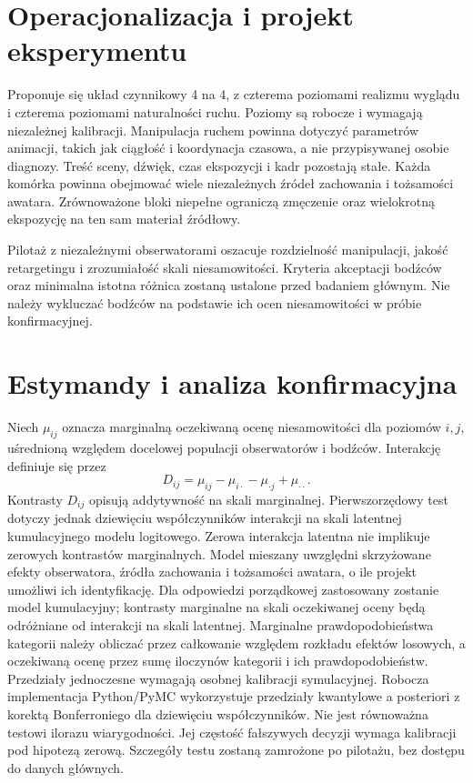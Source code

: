 \section{Operacjonalizacja i projekt eksperymentu}
Proponuje się układ czynnikowy 4 na 4, z czterema poziomami realizmu wyglądu i czterema poziomami naturalności ruchu. Poziomy są robocze i wymagają niezależnej kalibracji. Manipulacja ruchem powinna dotyczyć parametrów animacji, takich jak ciągłość i koordynacja czasowa, a nie przypisywanej osobie diagnozy. Treść sceny, dźwięk, czas ekspozycji i kadr pozostają stałe. Każda komórka powinna obejmować wiele niezależnych źródeł zachowania i tożsamości awatara. Zrównoważone bloki niepełne ograniczą zmęczenie oraz wielokrotną ekspozycję na ten sam materiał źródłowy.

Pilotaż z niezależnymi obserwatorami oszacuje rozdzielność manipulacji, jakość retargetingu i zrozumiałość skali niesamowitości. Kryteria akceptacji bodźców oraz minimalna istotna różnica zostaną ustalone przed badaniem głównym. Nie należy wykluczać bodźców na podstawie ich ocen niesamowitości w próbie konfirmacyjnej.

\section{Estymandy i analiza konfirmacyjna}
Niech $\mu_{ij}$ oznacza marginalną oczekiwaną ocenę niesamowitości dla poziomów $i,j$, uśrednioną względem docelowej populacji obserwatorów i bodźców. Interakcję definiuje się przez
\[
D_{ij}=\mu_{ij}-\mu_{i\cdot}-\mu_{\cdot j}+\mu_{\cdot\cdot}.
\]
Kontrasty $D_{ij}$ opisują addytywność na skali marginalnej. Pierwszorzędowy test dotyczy jednak dziewięciu współczynników interakcji na skali latentnej kumulacyjnego modelu logitowego. Zerowa interakcja latentna nie implikuje zerowych kontrastów marginalnych. Model mieszany uwzględni skrzyżowane efekty obserwatora, źródła zachowania i tożsamości awatara, o ile projekt umożliwi ich identyfikację. Dla odpowiedzi porządkowej zastosowany zostanie model kumulacyjny; kontrasty marginalne na skali oczekiwanej oceny będą odróżniane od interakcji na skali latentnej. Marginalne prawdopodobieństwa kategorii należy obliczać przez całkowanie względem rozkładu efektów losowych, a oczekiwaną ocenę przez sumę iloczynów kategorii i ich prawdopodobieństw. Przedziały jednoczesne wymagają osobnej kalibracji symulacyjnej. Robocza implementacja Python/PyMC wykorzystuje przedziały kwantylowe a posteriori z korektą Bonferroniego dla dziewięciu współczynników. Nie jest równoważna testowi ilorazu wiarygodności. Jej częstość fałszywych decyzji wymaga kalibracji pod hipotezą zerową. Szczegóły testu zostaną zamrożone po pilotażu, bez dostępu do danych głównych.

